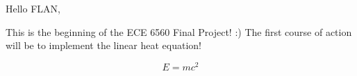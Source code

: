 \documentclass{article}
\begin{document}
Hello FLAN,



This is the beginning of the ECE 6560 Final Project! :)
The first course of action will be to implement the linear heat equation!

\[
E = mc^2
\]
\end{document}
